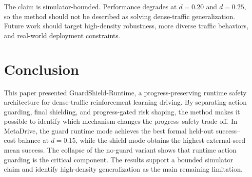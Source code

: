 \documentclass[conference,a4paper]{IEEEtran}
\newcommand{\method}{GuardShield-Runtime}
\begin{document}
The claim is simulator-bounded. Performance degrades at $d=0.20$ and $d=0.25$, so the method should not be described as solving dense-traffic generalization. Future work should target high-density robustness, more diverse traffic behaviors, and real-world deployment constraints.

\section{Conclusion}
This paper presented \method{}, a progress-preserving runtime safety architecture for dense-traffic reinforcement learning driving. By separating action guarding, final shielding, and progress-gated risk shaping, the method makes it possible to identify which mechanism changes the progress--safety trade-off. In MetaDrive, the guard runtime mode achieves the best formal held-out success--cost balance at $d=0.15$, while the shield mode obtains the highest external-seed mean success. The collapse of the no-guard variant shows that runtime action guarding is the critical component. The results support a bounded simulator claim and identify high-density generalization as the main remaining limitation.
\FloatBarrier
\balance


\end{document}
